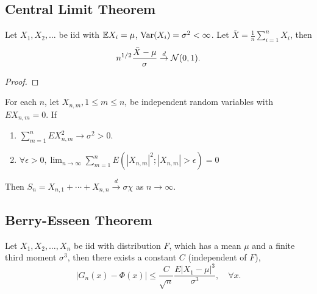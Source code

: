 \subsection{Central Limit Theorem}

\begin{theorem}\label{thm:classic-central-limit-theorem}
	Let \(X_1,X_2,\ldots\) be iid with \(\mathbb{E} X_{i}=\mu\), \(\mathrm{Var}(X_{i})=\sigma^2<\infty\). Let \(\bar{X}=\frac{1}{n}\sum_{i=1}^{n}X_{i}\), then
	\begin{equation}
		n^{1/2}\frac{\bar{X}-\mu}{\sigma}\stackrel{d}{\rightarrow}\mathcal{N}(0,1).
	\end{equation}
\end{theorem}

\begin{proof}

\end{proof}

\begin{theorem}
	For each \(n\), let \(X_{n,m},1\leq m\leq n\), be independent random variables with \(EX_{n,m}=0\). If
	\begin{enumerate}
		\item \(\sum_{m=1}^{n}EX_{n,m}^{2} \rightarrow \sigma^{2}>0\).
		\item \(\forall\epsilon>0,\lim_{n\rightarrow\infty}\sum_{m=1}^{n}E\left(\left|X_{n,m}\right|^{2};\left|X_{n,m}\right|>\epsilon\right)=0\)
	\end{enumerate}
	Then \(S_{n}=X_{n,1}+\cdots+X_{n,n}\stackrel{d}{\rightarrow}\sigma\chi\) as \(n\rightarrow\infty\).
\end{theorem}

\subsection{Berry-Esseen Theorem}

\begin{theorem}
	Let \(X_{1},X_{2},\ldots,X_{n}\) be iid with distribution \(F\), which has a mean \(\mu\) and a finite third moment \(\sigma^{3}\), then there exists a constant \(C\) (independent of \(F\)),
	\begin{equation}
		\left|G_{n}(x)-\Phi(x)\right|\leq\frac{C}{\sqrt{n}}\frac{E\left|X_{1}-\mu\right|^{3}}{\sigma^{3}},\quad\forall x.
	\end{equation}
\end{theorem}

